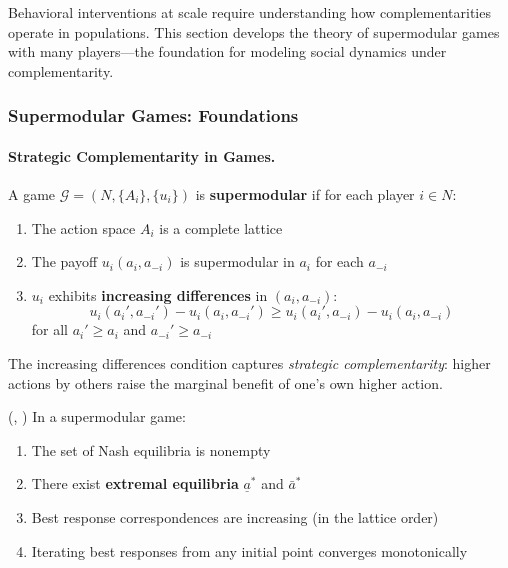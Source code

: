Behavioral interventions at scale require understanding how complementarities 
operate in populations. This section develops the theory of supermodular games 
with many players---the foundation for modeling social dynamics under complementarity.

\subsubsection{Supermodular Games: Foundations}

\paragraph{Strategic Complementarity in Games.}

\begin{definition}
\label{def:super-game}
A game $\mathcal{G} = (N, \{A_i\}, \{u_i\})$ is \textbf{supermodular} if for each 
player $i \in N$:
\begin{enumerate}
    \item The action space $A_i$ is a complete lattice
    \item The payoff $u_i(a_i, a_{-i})$ is supermodular in $a_i$ for each $a_{-i}$
    \item $u_i$ exhibits \textbf{increasing differences} in $(a_i, a_{-i})$:
    \begin{equation}
    u_i(a_i', a_{-i}') - u_i(a_i, a_{-i}') \geq u_i(a_i', a_{-i}) - u_i(a_i, a_{-i})
    \end{equation}
    for all $a_i' \geq a_i$ and $a_{-i}' \geq a_{-i}$
\end{enumerate}
\end{definition}

The increasing differences condition captures \emph{strategic complementarity}: 
higher actions by others raise the marginal benefit of one's own higher action.

\begin{theorem}
\label{thm:topkis-vives}
\textup{(\citet{topkis1998supermodularity}, \citet{vives1990nash})}
In a supermodular game:
\begin{enumerate}
    \item The set of Nash equilibria is nonempty
    \item There exist \textbf{extremal equilibria} $\underline{a}^*$ and $\bar{a}^*$
    \item Best response correspondences are increasing (in the lattice order)
    \item Iterating best responses from any initial point converges monotonically
\end{enumerate}
\end{theorem}

